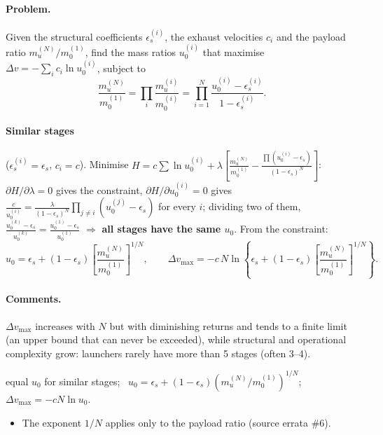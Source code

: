 \paragraph{Problem.} Given the structural coefficients $\epsilon_s^{(i)}$, the exhaust velocities $c_i$ and the payload ratio
$m_u^{(N)}/m_0^{(1)}$, find the mass ratios $u_0^{(i)}$ that maximise $\Delta v=-\sum_{i}c_i\ln u_0^{(i)}$, subject to
\[\frac{m_u^{(N)}}{m_0^{(1)}}=\prod_i\frac{m_u^{(i)}}{m_0^{(i)}}=\prod_{i=1}^N\frac{u_0^{(i)}-\epsilon_s^{(i)}}{1-\epsilon_s^{(i)}}.\]
\paragraph{Similar stages} ($\epsilon_s^{(i)}=\epsilon_s$, $c_i=c$). Minimise
$H=c\sum\ln u_0^{(i)}+\lambda\left[\frac{m_u^{(N)}}{m_0^{(1)}}-\frac{\prod(u_0^{(i)}-\epsilon_s)}{(1-\epsilon_s)^N}\right]$: $\partial H/\partial\lambda=0$ gives the constraint,
$\partial H/\partial u_0^{(i)}=0$ gives $\frac{c}{u_0^{(i)}}=\frac{\lambda}{(1-\epsilon_s)^N}\prod_{j\neq i}(u_0^{(j)}-\epsilon_s)$ for every $i$; dividing two of them,
$\frac{u_0^{(k)}-\epsilon_s}{u_0^{(k)}}=\frac{u_0^{(1)}-\epsilon_s}{u_0^{(1)}}$ $\Rightarrow$ \textbf{all stages have the same $u_0$}. From the constraint:
\begin{equation}
u_0=\epsilon_s+(1-\epsilon_s)\left[\frac{m_u^{(N)}}{m_0^{(1)}}\right]^{1/N},\qquad
\Delta v_{\max}=-c\,N\ln\left\{\epsilon_s+(1-\epsilon_s)\left[\frac{m_u^{(N)}}{m_0^{(1)}}\right]^{1/N}\right\}.
\end{equation}
\paragraph{Comments.} $\Delta v_{\max}$ increases with $N$ but with diminishing returns and tends to a finite limit (an upper bound that can never be
exceeded), while structural and operational complexity grow: launchers rarely have more than 5 stages (often 3--4).
\begin{keyf}
equal $u_0$ for similar stages; \ $u_0=\epsilon_s+(1-\epsilon_s)(m_u^{(N)}/m_0^{(1)})^{1/N}$; \ $\Delta v_{\max}=-cN\ln u_0$.
\end{keyf}
\pitfalls
\begin{itemize}
\item The exponent $1/N$ applies only to the payload ratio (source errata \#6).
\end{itemize}

